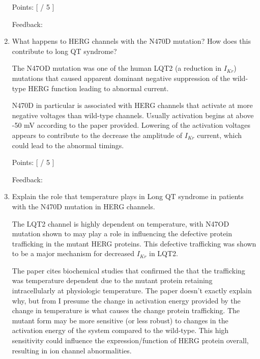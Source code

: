 \documentclass[basic,plain]{inVerba-notes}
\begin{document}
\begin{enumerate}
    Points: [\hspace{16pt} / 5 ]

    Feedback: 

    \vspace*{50pt}
    
    \item What happens to HERG channels with the N470D mutation? How does this contribute to long QT syndrome? 
    {\color{black}

    The N47OD mutation was one of the human LQT2 (a reduction in \(I_{Kr}\)) mutations that caused apparent dominant negative suppression of the wild-type HERG function leading to abnormal current.

    N470D in particular is associated with HERG channels that activate at more negative voltages than wild-type channels. Usually activation begins at above -50 mV according to the paper provided. Lowering of the activation voltages appears to contribute to the decrease the amplitude of \(I_{Kr}\) current, which could lead to the abnormal timings.}

    Points: [\hspace{16pt} / 5 ]

    Feedback: 

    \vspace*{70pt}

    \item Explain the role that temperature plays in Long QT syndrome in patients with the N470D mutation in HERG channels. 
    {\color{black}

    The LQT2 channel is highly dependent on temperature, with N47OD mutation shown to may play a role in influencing the defective protein trafficking in the mutant HERG proteins. This defective trafficking was shown to be a major mechanism for decreased \(I_{Kr}\) in LQT2. 

    The paper cites biochemical studies that confirmed the that the trafficking was temperature dependent due to the mutant protein retaining intracellularly at physiologic temperature. The paper doesn't exactly explain why, but from I presume the change in activation energy provided by the change in temperature is what causes the change protein trafficking. The mutant form may be more sensitive (or less robust) to changes in the activation energy of the system compared to the wild-type. This high sensitivity could influence the expression/function of HERG protein overall, resulting in ion channel abnormalities. 
    
    }


\end{enumerate}
\end{document}
